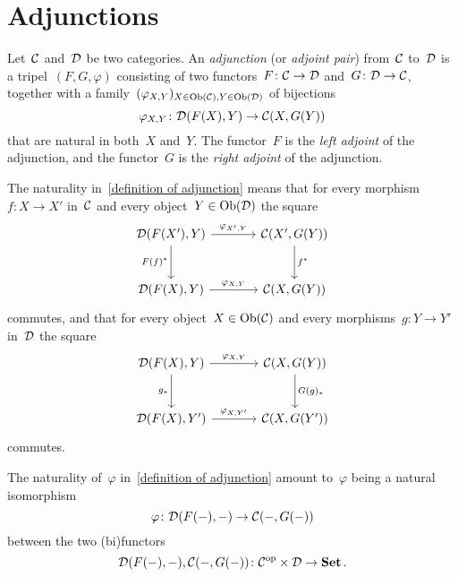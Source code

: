 \section{Adjunctions}


\begin{definition}
  \label{definition of adjunction}
  Let~$\mathcal{C}$ and~$\mathcal{D}$ be two categories.
  An \emph{adjunction} (or \emph{adjoint pair}) from~$\mathcal{C}$ to~$\mathcal{D}$ is a tripel~$(F,G,\varphi)$ consisting of two functors~$F \colon \mathcal{C} \to \mathcal{D}$ and~$G \colon \mathcal{D} \to \mathcal{C}$, together with a family~$(\varphi_{X,Y})_{X \in \operatorname{Ob}(\mathcal{C}), Y \in \operatorname{Ob}(\mathcal{D})}$ of bijections
  \[
            \varphi_{X,Y}
    \colon  \mathcal{D}(F(X), Y)
    \to     \mathcal{C}(X, G(Y))
  \]
  that are natural in both~$X$ and~$Y$.
  The functor~$F$ is the \emph{left adjoint} of the adjunction, and the functor~$G$ is the \emph{right adjoint} of the adjunction.
\end{definition}


\begin{remarknonum}
  The naturality in~\cref{definition of adjunction} means that for every morphism~$f \colon X \to X'$ in~$\mathcal{C}$ and every object~$Y \in \operatorname{Ob}(\mathcal{D})$ the square
  \[
    \begin{tikzcd}[sep = large]
        \Dcat(F(X'), Y)
        \arrow{r}[above]{\varphi_{X',Y}}
        \arrow{d}[left]{F(f)^*}
      & \Ccat(X', G(Y))
        \arrow{d}[right]{f^*}
      \\
        \Dcat(F(X), Y)
        \arrow{r}[above]{\varphi_{X,Y}}
      & \Ccat(X, G(Y))
    \end{tikzcd}
  \]
  commutes, and that for every object~$X \in \operatorname{Ob}(\mathcal{C})$ and every morphisms~$g \colon Y \to Y'$ in~$\mathcal{D}$ the square
  \[
    \begin{tikzcd}[sep = large]
        \Dcat(F(X), Y)
        \arrow{r}[above]{\varphi_{X,Y}}
        \arrow{d}[left]{g_*}
      & \Ccat(X, G(Y))
        \arrow{d}[right]{G(g)_*}
      \\
        \Dcat(F(X), Y')
        \arrow{r}[above]{\varphi_{X,Y'}}
      & \Ccat(X, G(Y'))
    \end{tikzcd}
  \]
  commutes.
\end{remarknonum}


\begin{remark*}
  The naturality of~$\varphi$ in~\cref{definition of adjunction} amount to~$\varphi$ being a natural isomorphism
  \[
            \varphi
    \colon  \mathcal{D}(F(-), -)
    \to     \mathcal{C}(-, G(-))
  \]
  between the two (bi)functors
  \[
            \mathcal{D}(F(-), -), \mathcal{C}(-, G(-))
    \colon  \mathcal{C}^{\mathrm{op}} \times \mathcal{D}
    \to     \mathbf{Set} \,.
  \]
\end{remark*}



